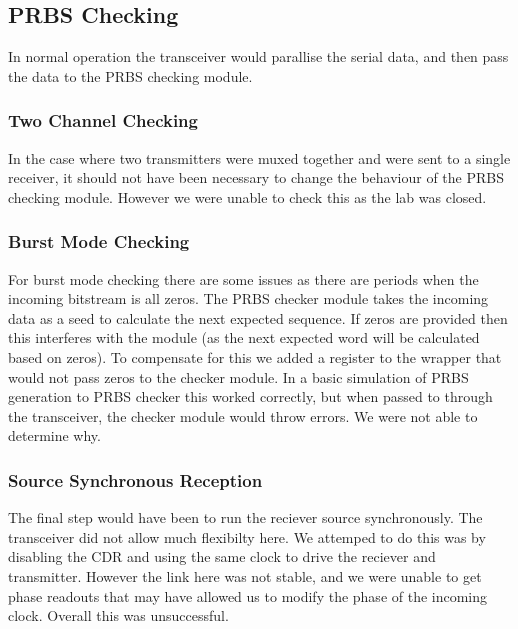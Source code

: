 

\subsection{PRBS Checking}%
\label{sub:prbs_checking}
In normal operation the transceiver would parallise the serial data, and then
pass the data to the PRBS checking module.  

\subsubsection{Two Channel Checking}%
\label{ssub:two_channel_checking}
In the case where two transmitters were muxed together and were sent to a
single receiver, it should not have been necessary to change the behaviour of
the PRBS checking module.
However we were unable to check this as the lab was closed.

\subsubsection{Burst Mode Checking}%
\label{ssub:burst_mode_checking}
For burst mode checking there are some issues as there are periods when the
incoming bitstream is all zeros. The PRBS checker module takes the incoming
data as a seed to calculate the next expected sequence. If zeros are provided
then this interferes with the module (as the next expected word will be calculated
based on zeros). To compensate for this we added a register to the wrapper that
would not pass zeros to the checker module. In a basic simulation of PRBS generation
to PRBS checker this worked correctly, but when passed to through the
transceiver, the checker module would throw errors.  We were not able to determine why.

\subsubsection{Source Synchronous Reception}%
\label{ssub:source_synchronous_reception}
The final step would have been to run the reciever source synchronously. The
transceiver did not allow much flexibilty here. We attemped to do this was by
disabling the CDR and using the same clock to drive the reciever and
transmitter. However the link here was not stable, and we were unable to get
phase readouts that may have allowed us to modify the phase of the incoming
clock. Overall this was unsuccessful.


